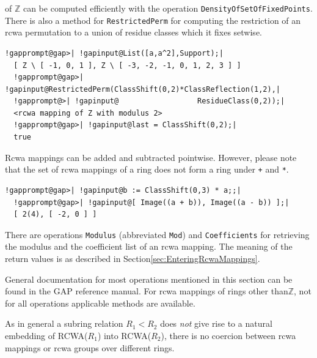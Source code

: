 \documentclass[a4paper,11pt]{report}
\begin{document}
{{of {\ensuremath{\mathbb Z}} can be computed efficiently with the operation \texttt{DensityOfSetOfFixedPoints}. There is also a method for \texttt{RestrictedPerm} for computing the restriction of an rcwa permutation to a union of residue
classes which it fixes setwise. 
\begin{Verbatim}[commandchars=!@|,fontsize=\small,frame=single,label=Example]
  !gapprompt@gap>| !gapinput@List([a,a^2],Support);|
  [ Z \ [ -1, 0, 1 ], Z \ [ -3, -2, -1, 0, 1, 2, 3 ] ]
  !gapprompt@gap>| !gapinput@RestrictedPerm(ClassShift(0,2)*ClassReflection(1,2),|
  !gapprompt@>| !gapinput@                  ResidueClass(0,2));|
  <rcwa mapping of Z with modulus 2>
  !gapprompt@gap>| !gapinput@last = ClassShift(0,2);|
  true
\end{Verbatim}
 Rcwa mappings can be added and subtracted pointwise. However, please note that
the set of rcwa mappings of a ring does not form a ring under \texttt{+} and \texttt{*}. 

 
\begin{Verbatim}[commandchars=!@|,fontsize=\small,frame=single,label=Example]
  !gapprompt@gap>| !gapinput@b := ClassShift(0,3) * a;;|
  !gapprompt@gap>| !gapinput@[ Image((a + b)), Image((a - b)) ];|
  [ 2(4), [ -2, 0 ] ]
\end{Verbatim}
      There are operations \texttt{Modulus} (abbreviated \texttt{Mod}) and \texttt{Coefficients} for retrieving the modulus and the coefficient list of an rcwa mapping. The
meaning of the return values is as described in Section{\nobreakspace}\ref{sec:EnteringRcwaMappings}. 

 General documentation for most operations mentioned in this section can be
found in the \textsf{GAP} reference manual. For rcwa mappings of rings other
than{\nobreakspace}{\ensuremath{\mathbb Z}}, not for all operations applicable
methods are available. 

 As in general a subring relation $R_1<R_2$ does \emph{not} give rise to a natural embedding of RCWA($R_1$) into RCWA($R_2$), there is no coercion between rcwa mappings or rcwa groups over different
rings. }

  
}
\end{document}

